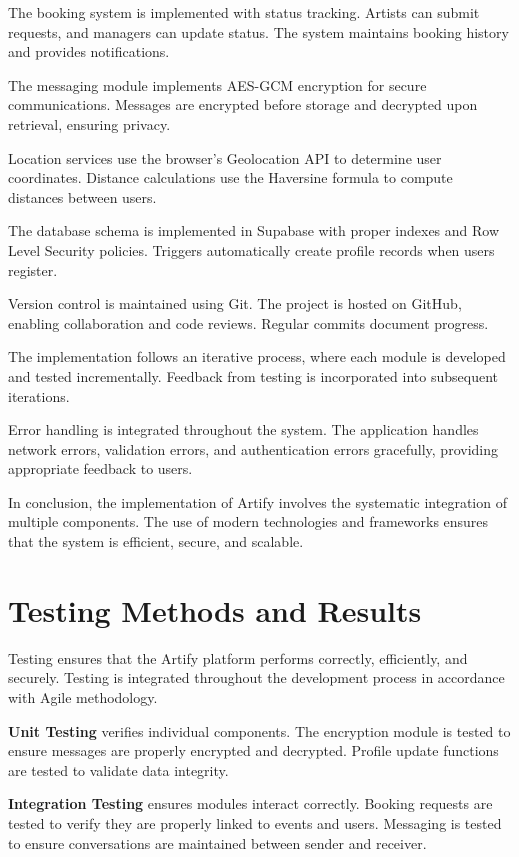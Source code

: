 \documentclass[12pt,a4paper]{report}
\begin{document}
The booking system is implemented with status tracking. Artists can submit requests, and managers can update status. The system maintains booking history and provides notifications.

The messaging module implements AES-GCM encryption for secure communications. Messages are encrypted before storage and decrypted upon retrieval, ensuring privacy.

Location services use the browser's Geolocation API to determine user coordinates. Distance calculations use the Haversine formula to compute distances between users.

The database schema is implemented in Supabase with proper indexes and Row Level Security policies. Triggers automatically create profile records when users register.

Version control is maintained using Git. The project is hosted on GitHub, enabling collaboration and code reviews. Regular commits document progress.

The implementation follows an iterative process, where each module is developed and tested incrementally. Feedback from testing is incorporated into subsequent iterations.

Error handling is integrated throughout the system. The application handles network errors, validation errors, and authentication errors gracefully, providing appropriate feedback to users.

In conclusion, the implementation of Artify involves the systematic integration of multiple components. The use of modern technologies and frameworks ensures that the system is efficient, secure, and scalable.

\section{Testing Methods and Results}

Testing ensures that the Artify platform performs correctly, efficiently, and securely. Testing is integrated throughout the development process in accordance with Agile methodology.

\textbf{Unit Testing} verifies individual components. The encryption module is tested to ensure messages are properly encrypted and decrypted. Profile update functions are tested to validate data integrity.

\textbf{Integration Testing} ensures modules interact correctly. Booking requests are tested to verify they are properly linked to events and users. Messaging is tested to ensure conversations are maintained between sender and receiver.
\end{document}
